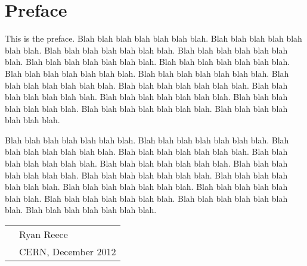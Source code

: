 
\chapter*{Preface}

This is the preface.  Blah blah blah blah blah blah blah.
Blah blah blah blah blah blah blah.  Blah blah blah blah blah blah blah.
Blah blah blah blah blah blah blah.  Blah blah blah blah blah blah blah.
Blah blah blah blah blah blah blah.  Blah blah blah blah blah blah blah.
Blah blah blah blah blah blah blah.  Blah blah blah blah blah blah blah.
Blah blah blah blah blah blah blah.  Blah blah blah blah blah blah blah.
Blah blah blah blah blah blah blah.  Blah blah blah blah blah blah blah.
Blah blah blah blah blah blah blah.  Blah blah blah blah blah blah blah.

Blah blah blah blah blah blah blah.  Blah blah blah blah blah blah blah.
Blah blah blah blah blah blah blah.  Blah blah blah blah blah blah blah.
Blah blah blah blah blah blah blah.  Blah blah blah blah blah blah blah.
Blah blah blah blah blah blah blah.  Blah blah blah blah blah blah blah.
Blah blah blah blah blah blah blah.  Blah blah blah blah blah blah blah.
Blah blah blah blah blah blah blah.  Blah blah blah blah blah blah blah.
Blah blah blah blah blah blah blah.  Blah blah blah blah blah blah blah.

\vspace{0.05\textheight}

\begin{tabular}{p{} l}
  & Ryan Reece            \\
  & CERN, December 2012   \\
\end{tabular}

